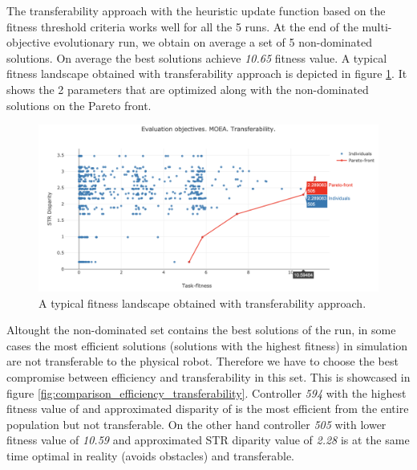 The transferability approach with the heuristic update function based on the fitness threshold criteria works well for all the 5 runs. At the end of the multi-objective evolutionary run, we obtain on average a set of 5 non-dominated solutions. On average the best solutions achieve \textit{10.65} fitness value. A typical fitness landscape obtained with transferability approach is depicted in figure \ref{fig:best_pareto}. It shows the 2 parameters that are optimized along with the non-dominated solutions on the Pareto front.

\begin{figure}[H]
	\centering
  	\includegraphics[width=14cm]{include/images/pareto_best_moea.PNG}
  	\caption{A typical fitness landscape obtained with transferability approach.}
  	\label{fig:best_pareto}
\end{figure}

Altought the non-dominated set contains the best solutions of the run, in some cases the most efficient solutions (solutions with the highest fitness) in simulation are not transferable to the physical  robot. Therefore we have to choose the best compromise between efficiency and transferability in this set. This is showcased in figure \ref{fig:comparison_efficiency_transferability}. Controller \textit{594} with the highest fitness value of  and approximated disparity of  is the most efficient from the entire population but not transferable. On the other hand controller \textit{505} with lower fitness value of \textit{10.59} and approximated STR diparity value of \textit{2.28} is at the same time optimal in reality (avoids obstacles) and transferable.

